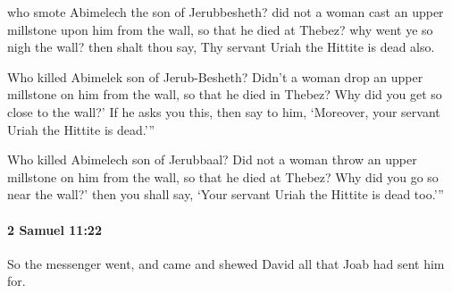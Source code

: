 			\begin{versebox}
					\item[BHS] 
					\item[ASV] who smote Abimelech the son of Jerubbesheth? did not a woman cast an upper millstone upon him from the wall, so that he died at Thebez? why went ye so nigh the wall? then shalt thou say, Thy servant Uriah the Hittite is dead also.
					\item[NIV] Who killed Abimelek son of Jerub-Besheth? Didn’t a woman drop an upper millstone on him from the wall, so that he died in Thebez? Why did you get so close to the wall?’ If he asks you this, then say to him, ‘Moreover, your servant Uriah the Hittite is dead.’”
					\item[NRSV] Who killed Abimelech son of Jerubbaal? Did not a woman throw an upper millstone on him from the wall, so that he died at Thebez? Why did you go so near the wall?’ then you shall say, ‘Your servant Uriah the Hittite is dead too.’”
			\end{versebox}

		\paragraph{2 Samuel 11:22} %
			\label{2SAMUEL-11-22}

			So the messenger went, and came and shewed David all that Joab had sent him for.

